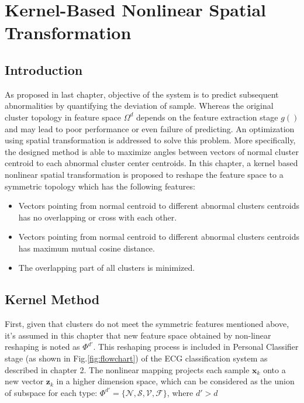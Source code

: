 \chapter{Kernel-Based Nonlinear Spatial Transformation}\label{ch:spheremapping}
\section{Introduction}

As proposed in last chapter, objective of the system is to predict subsequent abnormalities by quantifying the deviation of sample. Whereas the original cluster topology in feature space $\Omega^d$ depends on the feature extraction stage $g()$ and may lead to poor performance or even failure of predicting. An optimization using spatial transformation is addressed to solve this problem. More specifically, the designed method is able to maximize angles between vectors of normal cluster centroid to each abnormal cluster center centroids. In this chapter, a kernel based nonlinear spatial transformation is proposed to reshape the feature space to a symmetric topology which has the following features:
 \begin{itemize}
     \item Vectors pointing from normal centroid to different abnormal clusters centroids has no overlapping or cross with each other.
     \item Vectors pointing from normal centroid to different abnormal clusters centroids has maximum mutual cosine distance.
     \item The overlapping part of all clusters is minimized.
 \end{itemize}



\section{Kernel Method}

First, given that clusters do not meet the symmetric features mentioned above, it's assumed in this chapter that new feature space obtained by non-linear reshaping is noted as $\Phi^{d'}$. This reshaping process is included in Personal Classifier stage (as shown in Fig.\ref{fig:flowchart}) of the ECG classification system as described in chapter 2. The nonlinear mapping projects each sample $\mathbf{x}_k$   onto a new vector $\mathbf{z}_k$ in a higher dimension space, which can be considered as the union of subspace for each type: $\Phi^{d'}=\{\mathcal{N},\mathcal{S},\mathcal{V},\mathcal{F}\}$, where $d'>d$

